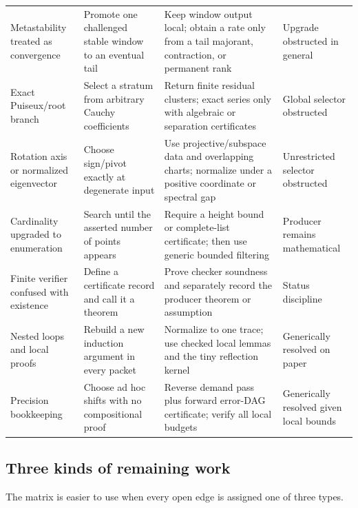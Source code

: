 \begin{longtable}{@{}>{\raggedright\arraybackslash}p{}>{\raggedright\arraybackslash}p{}>{\raggedright\arraybackslash}p{}>{\raggedright\arraybackslash}p{}@{}}
\addlinespace
Metastability treated as convergence & Promote one challenged stable window to an eventual tail & Keep window output local; obtain a rate only from a tail majorant, contraction, or permanent rank & Upgrade obstructed in general \\
\addlinespace
Exact Puiseux/root branch & Select a stratum from arbitrary Cauchy coefficients & Return finite residual clusters; exact series only with algebraic or separation certificates & Global selector obstructed \\
\addlinespace
Rotation axis or normalized eigenvector & Choose sign/pivot exactly at degenerate input & Use projective/subspace data and overlapping charts; normalize under a positive coordinate or spectral gap & Unrestricted selector obstructed \\
\addlinespace
Cardinality upgraded to enumeration & Search until the asserted number of points appears & Require a height bound or complete-list certificate; then use generic bounded filtering & Producer remains mathematical \\
\addlinespace
Finite verifier confused with existence & Define a certificate record and call it a theorem & Prove checker soundness and separately record the producer theorem or assumption & Status discipline \\
\addlinespace
Nested loops and local proofs & Rebuild a new induction argument in every packet & Normalize to one trace; use checked local lemmas and the tiny reflection kernel & Generically resolved on paper \\
\addlinespace
Precision bookkeeping & Choose ad hoc shifts with no compositional proof & Reverse demand pass plus forward error-DAG certificate; verify all local budgets & Generically resolved given local bounds \\
\bottomrule
\end{longtable}
\endgroup

\subsection{Three kinds of remaining work}

The matrix is easier to use when every open edge is assigned one of three types.

